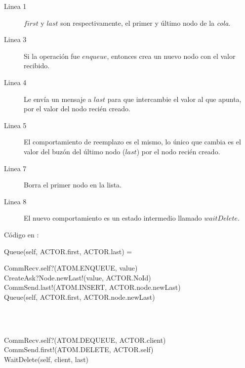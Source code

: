 \begin{description}
 \item [Linea 1] $first$ y $last$ son respectivamente, el primer y último nodo de la \textit{cola}.
 \item [Linea 3] Si la operación fue $enqueue$, entonces crea un nuevo nodo con el valor recibido. 
 \item [Linea 4] Le envía un mensaje a $last$ para que intercambie el valor al que apunta, por el valor del nodo recién creado.
 \item [Linea 5] El comportamiento de reemplazo es el mismo, lo único que cambia es el valor del buzón del último nodo ($last$) por el nodo recién creado.
 \item [Linea 7] Borra el primer nodo en la lista.
 \item [Linea 8] El nuevo comportamiento es un estado intermedio llamado $waitDelete$.
\end{description}

Código en \CSPm:

\begin{process}
Queue(self, ACTOR.first, ACTOR.last) = \\ \quad
  \begin{block}
  CommRecv.self?(ATOM.ENQUEUE, value) \then \\
  CreateAsk?Node.newLast!(value, ACTOR.NoId) \then \\
  CommSend.last!(ATOM.INSERT, ACTOR.node.newLast) \then \\
  Queue(self, ACTOR.first, ACTOR.node.newLast)
  \end{block} \\

  \Extchoice \\ \quad
  
  \begin{block}
  CommRecv.self?(ATOM.DEQUEUE, ACTOR.client) \then \\
  CommSend.first!(ATOM.DELETE, ACTOR.self) \then \\
  WaitDelete(self, client, last)
  \end{block} 
\end{process}

